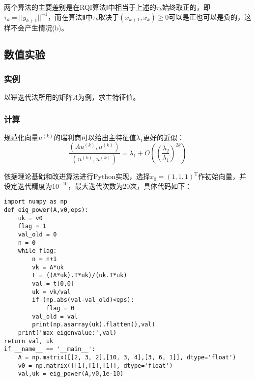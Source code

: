 \documentclass[UTF8]{ctexart}
\begin{document}
    两个算法的主要差别是在RQI算法Ⅰ中相当于上述的$\tau_k$始终取正的，即$\tau_k=||y_{k+1}||^{-1}$，而在算法Ⅱ中$\tau_k$取决于$(x_{k+1},x_k)\geq0$可以是正也可以是负的，这样不会产生情况(b)。
    \subsection{数值实验}
    \subsubsection{实例}
    以幂迭代法所用的矩阵$A$为例，求主特征值。
    \subsubsection{计算}
    规范化向量$u^{(k)}$的瑞利商可以给出主特征值$\lambda_1$更好的近似：
    \[\frac{\left(Au^{(k)},u^{(k)}\right)}{\left(u^{(k)},u^{(k)}\right)}=\lambda_1+O\left(\left(\frac{\lambda_2}{\lambda_1}\right)^{2k}\right)\]

    依据理论基础和改进算法进行Python实现，选择$x_0=(1,1,1)^{\mathrm{T}}$作初始向量，并设定迭代精度为$10^{-10}$，最大迭代次数为20次，具体代码如下：
    \begin{lstlisting}
import numpy as np
def eig_power(A,v0,eps):
    uk = v0
    flag = 1
    val_old = 0
    n = 0
    while flag:
        n = n+1
        vk = A*uk
        t = ((A*uk).T*uk)/(uk.T*uk)
        val = t[0,0]
        uk = vk/val
        if (np.abs(val-val_old)<eps):
            flag = 0
        val_old = val
        print(np.asarray(uk).flatten(),val)
    print('max eigenvalue:',val)
return val, uk
if __name__ == '__main__':
    A = np.matrix([[2, 3, 2],[10, 3, 4],[3, 6, 1]], dtype='float')
    v0 = np.matrix([[1],[1],[1]], dtype='float')
    val,uk = eig_power(A,v0,1e-10)
    \end{lstlisting}
\end{document}
